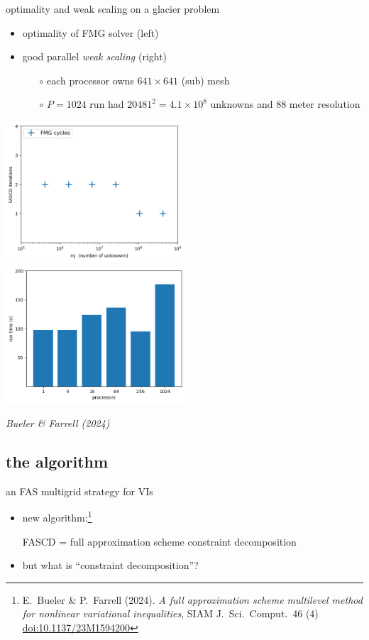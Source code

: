 \documentclass[svgnames,
               hyperref={colorlinks,citecolor=DeepPink4,linkcolor=FireBrick,urlcolor=Maroon},
               usepdftitle=false]  %
               {beamer}
\newcommand{\sdoi}[1]{\,{\tiny \href{https://doi.org/#1}{doi:#1}}}
\begin{document}
\begin{frame}{optimality and weak scaling on a glacier problem}

\begin{itemize}
\item optimality of FMG solver (left)
\item good parallel \emph{weak scaling} (right)
    \begin{itemize}
    \item[$\circ$] each processor owns $641\times 641$ (sub) mesh
    \item[$\circ$] $P=1024$ run had $20481^2=4.1\times 10^8$ unknowns and 88 meter resolution
    \end{itemize}
\end{itemize}

\bigskip
\mbox{\includegraphics[width=0.5\textwidth]{figs/sia.png} \includegraphics[width=0.5\textwidth]{../talk-dms/figs/siaweaktime.png}}

\hfill \scriptsize
\emph{Bueler \& Farrell (2024)}
\end{frame}


\subsection{the algorithm}

\begin{frame}{an FAS multigrid strategy for VIs}

\begin{itemize}
\item new algorithm:\footnote{E.~Bueler \& P.~Farrell (2024). \emph{A full approximation scheme multilevel method for nonlinear variational inequalities}, SIAM J.~Sci.~Comput.~46 (4) \sdoi{10.1137/23M1594200}}

\bigskip
{\color{FireBrick} FASCD = full approximation scheme constraint decomposition}

\bigskip
\item<2> but what is ``constraint decomposition''?
\end{itemize}
\end{frame}
\end{document}
